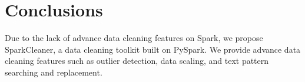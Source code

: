 \documentclass[sigconf]{acmart}
\begin{document}
\section{Conclusions}
Due to the lack of advance data cleaning features on Spark, we propose SparkCleaner, a data cleaning toolkit built on PySpark. We provide advance data cleaning features such as outlier detection, data scaling, and text pattern searching and replacement.



\end{document}
